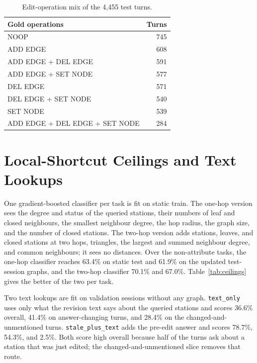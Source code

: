 \documentclass[11pt]{article}
\begin{document}
\begin{table}[t]
\centering
\small
\begin{tabular}{@{}lr@{}}
\toprule
\textbf{Gold operations} & \textbf{Turns} \\
\midrule
NOOP & 745 \\
ADD EDGE & 608 \\
ADD EDGE + DEL EDGE & 591 \\
ADD EDGE + SET NODE & 577 \\
DEL EDGE & 571 \\
DEL EDGE + SET NODE & 540 \\
SET NODE & 539 \\
ADD EDGE + DEL EDGE + SET NODE & 284 \\
\bottomrule
\end{tabular}
\caption{Edit-operation mix of the 4{,}455 test turns.}
\label{tab:opmix}
\end{table}

\section{Local-Shortcut Ceilings and Text Lookups}
\label{app:shortcuts}

One gradient-boosted classifier per task is fit on static train.
The one-hop version sees the degree and status of the queried stations, their numbers of leaf and closed neighbours, the smallest neighbour degree, the hop radius, the graph size, and the number of closed stations.
The two-hop version adds stations, leaves, and closed stations at two hops, triangles, the largest and summed neighbour degree, and common neighbours; it sees no distances.
Over the non-attribute tasks, the one-hop classifier reaches 63.4\% on static test and 61.9\% on the updated test-session graphs, and the two-hop classifier 70.1\% and 67.0\%.
Table~\ref{tab:ceilings} gives the better of the two per task.

Two text lookups are fit on validation sessions without any graph.
\texttt{text\_only} uses only what the revision text says about the queried stations and scores 36.6\% overall, 41.4\% on answer-changing turns, and 28.4\% on the changed-and-unmentioned turns.
\texttt{stale\_plus\_text} adds the pre-edit answer and scores 78.7\%, 54.3\%, and 2.5\%.
Both score high overall because half of the turns ask about a station that was just edited; the changed-and-unmentioned slice removes that route.
\end{document}
